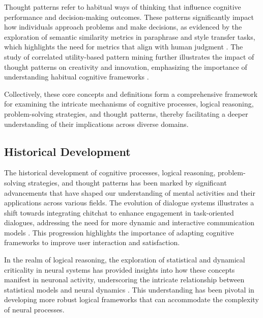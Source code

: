 Thought patterns refer to habitual ways of thinking that influence cognitive performance and decision-making outcomes. These patterns significantly impact how individuals approach problems and make decisions, as evidenced by the exploration of semantic similarity metrics in paraphrase and style transfer tasks, which highlights the need for metrics that align with human judgment \cite{yamshchikov2020styletransferparaphraselookingsensible}. The study of correlated utility-based pattern mining further illustrates the impact of thought patterns on creativity and innovation, emphasizing the importance of understanding habitual cognitive frameworks \cite{gan2019correlatedutilitybasedpatternmining}.



Collectively, these core concepts and definitions form a comprehensive framework for examining the intricate mechanisms of cognitive processes, logical reasoning, problem-solving strategies, and thought patterns, thereby facilitating a deeper understanding of their implications across diverse domains.



\subsection{Historical Development} \label{subsec:Historical Development}



The historical development of cognitive processes, logical reasoning, problem-solving strategies, and thought patterns has been marked by significant advancements that have shaped our understanding of mental activities and their applications across various fields. The evolution of dialogue systems illustrates a shift towards integrating chitchat to enhance engagement in task-oriented dialogues, addressing the need for more dynamic and interactive communication models \cite{stricker2024enhancingtaskorienteddialogueschitchat}. This progression highlights the importance of adapting cognitive frameworks to improve user interaction and satisfaction.



In the realm of logical reasoning, the exploration of statistical and dynamical criticality in neural systems has provided insights into how these concepts manifest in neuronal activity, underscoring the intricate relationship between statistical models and neural dynamics \cite{sorbaro2018statisticalmodelsneuralactivity}. This understanding has been pivotal in developing more robust logical frameworks that can accommodate the complexity of neural processes.



